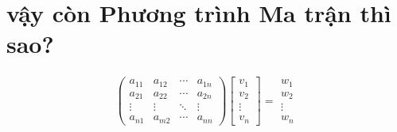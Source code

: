\documentclass[a4paper,12pt,notitlepage]{article}
\begin{document}
	\section{vậy còn Phương trình Ma trận thì sao?}
	\begin{gather*}
	\begin{pmatrix}
		a_{11} & a_{12} & \cdots & a_{1n} \\
		a_{21} & a_{22} & \cdots & a_{2n} \\
		\vdots & \vdots & \ddots & \vdots \\
		a_{n1} & a_{m2} & \cdots & a_{nn}
	\end{pmatrix}
	\begin{bmatrix}
		v_1 \\ v_2 \\ \vdots \\ v_n 
	\end{bmatrix}
	=
	\begin{array}{c}
		w_1 \\ w_2 \\ \vdots \\ w_n
	\end{array}
	\end{gather*}
\end{document}

